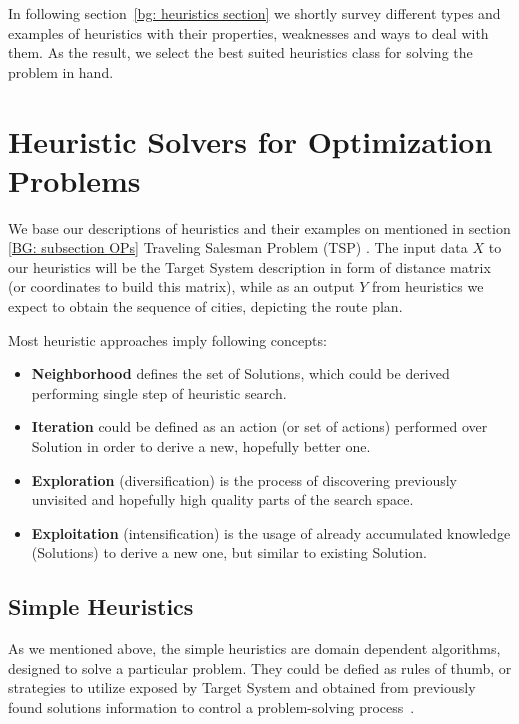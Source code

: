 In following section~\ref{bg: heuristics section} we shortly survey different types and examples of heuristics with their properties, weaknesses and ways to deal with them. As the result, we select the best suited heuristics class for solving the problem in hand.


\section{Heuristic Solvers for Optimization Problems}\label{bg: section heuristics}
We base our descriptions of heuristics and their examples on mentioned in section \ref{BG: subsection OPs} Traveling Salesman Problem (TSP) \cite{applegate2006traveling}. The input data $X$ to our heuristics will be the Target System description in form of distance matrix (or coordinates to build this matrix), while as an output $Y$ from heuristics we expect to obtain the sequence of cities, depicting the route plan.


Most heuristic approaches imply following concepts:
\begin{itemize}[itemsep=8pt]
	\item \textbf{Neighborhood} defines the set of Solutions, which could be derived performing single step of heuristic search.
	\item \textbf{Iteration} could be defined as an action (or set of actions) performed over Solution in order to derive a new, hopefully better one.
	\item \textbf{Exploration} (diversification) is the process of discovering previously unvisited and hopefully high quality parts of the search space.
	\item \textbf{Exploitation} (intensification) is the usage of already accumulated knowledge (Solutions) to derive a new one, but similar to existing Solution.
\end{itemize}


\subsection{Simple Heuristics}
As we mentioned above, the simple heuristics are domain dependent algorithms, designed to solve a particular problem.
They could be defied as rules of thumb, or strategies to utilize exposed by Target System and obtained from previously found solutions information to control a problem-solving process~\cite{pearl1984intelligent}. 

